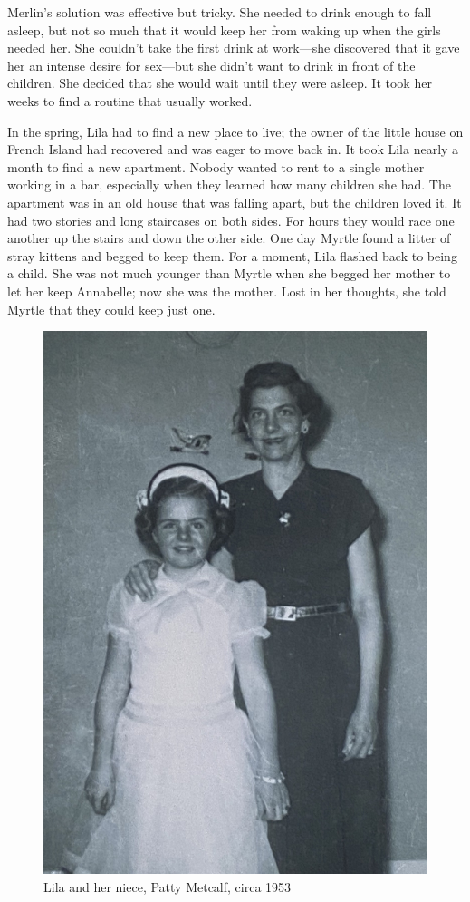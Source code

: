 \documentclass[
  letterpaper,
]{book}
\begin{document}
Merlin's solution was effective but tricky. She needed to drink enough
to fall asleep, but not so much that it would keep her from waking up
when the girls needed her. She couldn't take the first drink at
work---she discovered that it gave her an intense desire for sex---but
she didn't want to drink in front of the children. She decided that she
would wait until they were asleep. It took her weeks to find a routine
that usually worked.

In the spring, Lila had to find a new place to live; the owner of the
little house on French Island had recovered and was eager to move back
in. It took Lila nearly a month to find a new apartment. Nobody wanted
to rent to a single mother working in a bar, especially when they
learned how many children she had. The apartment was in an old house
that was falling apart, but the children loved it. It had two stories
and long staircases on both sides. For hours they would race one another
up the stairs and down the other side. One day Myrtle found a litter of
stray kittens and begged to keep them. For a moment, Lila flashed back
to being a child. She was not much younger than Myrtle when she begged
her mother to let her keep Annabelle; now she was the mother. Lost in
her thoughts, she told Myrtle that they could keep just one.

\begin{figure}[H]

{\centering \includegraphics[width=0.55\linewidth,height=\textheight,keepaspectratio]{images/Akou25rt.jpg}

}

\caption{Lila and her niece, Patty Metcalf, circa 1953}

\end{figure}%
\end{document}
